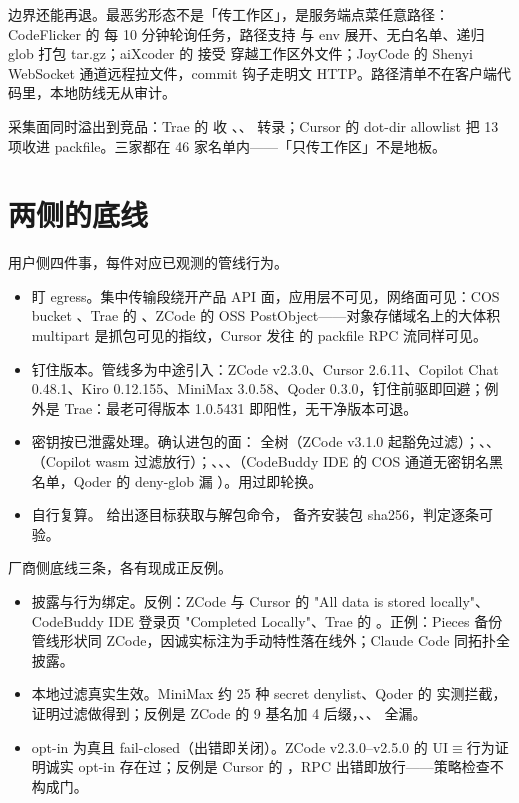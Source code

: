边界还能再退。最恶劣形态不是「传工作区」，是服务端点菜任意路径：CodeFlicker 的  每 10 分钟轮询任务，路径支持 \ep{\textasciitilde} 与 env 展开、无白名单、递归 glob 打包 tar.gz；aiXcoder 的  接受  穿越工作区外文件；JoyCode 的 Shenyi WebSocket 通道远程拉文件，commit 钩子走明文 HTTP。路径清单不在客户端代码里，本地防线无从审计。

采集面同时溢出到竞品：Trae 的  收 、、 转录；Cursor 的 dot-dir allowlist 把  13 项收进 packfile。三家都在 46 家名单内——「只传工作区」不是地板。

\section{两侧的底线}

用户侧四件事，每件对应已观测的管线行为。

\begin{itemize}
\item 盯 egress。集中传输段绕开产品 API 面，应用层不可见，网络面可见：COS bucket 、Trae 的 、ZCode 的 OSS PostObject——对象存储域名上的大体积 multipart 是抓包可见的指纹，Cursor 发往  的 packfile RPC 流同样可见。
\item 钉住版本。管线多为中途引入：ZCode v2.3.0、Cursor 2.6.11、Copilot Chat 0.48.1、Kiro 0.12.155、MiniMax 3.0.58、Qoder 0.3.0，钉住前驱即回避；例外是 Trae：最老可得版本 1.0.5431 即阳性，无干净版本可退。
\item 密钥按已泄露处理。确认进包的面： 全树（ZCode v3.1.0 起豁免过滤）；、、（Copilot wasm 过滤放行）；、、、（CodeBuddy IDE 的 COS 通道无密钥名黑名单，Qoder 的 deny-glob 漏 ）。用过即轮换。
\item 自行复算。 给出逐目标获取与解包命令， 备齐安装包 sha256，判定逐条可验。
\end{itemize}

厂商侧底线三条，各有现成正反例。

\begin{itemize}
\item 披露与行为绑定。反例：ZCode 与 Cursor 的 "All data is stored locally"、CodeBuddy IDE 登录页 "Completed Locally"、Trae 的 。正例：Pieces 备份管线形状同 ZCode，因诚实标注为手动特性落在线外；Claude Code 同拓扑全披露。
\item 本地过滤真实生效。MiniMax 约 25 种 secret denylist、Qoder 的  实测拦截，证明过滤做得到；反例是 ZCode 的 9 基名加 4 后缀，、、 全漏。
\item opt-in 为真且 fail-closed（出错即关闭）。ZCode v2.3.0–v2.5.0 的 UI$\equiv$行为证明诚实 opt-in 存在过；反例是 Cursor 的 ，RPC 出错即放行——策略检查不构成门。
\end{itemize}

